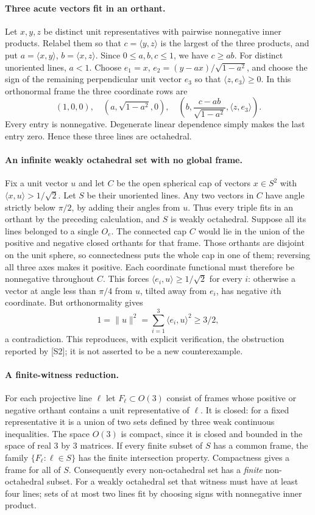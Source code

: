 \documentclass[11pt,a4paper]{article}
\begin{document}
\paragraph{Three acute vectors fit in an orthant.}
Let $x,y,z$ be distinct unit representatives with pairwise nonnegative inner
products. Relabel them so that $c=\langle y,z\rangle$ is the largest of the
three products, and put $a=\langle x,y\rangle$, $b=\langle x,z\rangle$.
Since $0\le a,b,c\le1$, we have $c\ge ab$. For distinct unoriented lines,
$a<1$. Choose $e_1=x$, $e_2=(y-ax)/\sqrt{1-a^2}$, and choose the sign of the
remaining perpendicular unit vector $e_3$ so that $\langle z,e_3\rangle\ge0$.
In this orthonormal frame the three coordinate rows are
\[
 (1,0,0),\quad(a,\sqrt{1-a^2},0),\quad
 \left(b,\frac{c-ab}{\sqrt{1-a^2}},\langle z,e_3\rangle\right).
\]
Every entry is nonnegative. Degenerate linear dependence simply makes the
last entry zero. Hence these three lines are octahedral.

\paragraph{An infinite weakly octahedral set with no global frame.}
Fix a unit vector $u$ and let $C$ be the open spherical cap of vectors
$x\in S^2$ with $\langle x,u\rangle>1/\sqrt2$. Let $S$ be their unoriented
lines. Any two vectors in $C$ have angle strictly below $\pi/2$, by adding
their angles from $u$. Thus every triple fits in an orthant by the preceding
calculation, and $S$ is weakly octahedral.
Suppose all its lines belonged to a single $O_e$. The connected cap $C$
would lie in the union of the positive and negative closed orthants for
that frame. Those orthants are disjoint on the unit sphere, so connectedness
puts the whole cap in one of them; reversing all three axes makes it positive.
Each coordinate functional must therefore be nonnegative throughout $C$.
This forces $\langle e_i,u\rangle\ge1/\sqrt2$ for every $i$: otherwise a vector
at angle less than $\pi/4$ from $u$, tilted away from $e_i$, has negative
$i$th coordinate. But orthonormality gives
\[
 1=\|u\|^2=\sum_{i=1}^3\langle e_i,u\rangle^2\ge3/2,
\]
a contradiction. This reproduces, with explicit verification, the obstruction
reported by [S2]; it is not asserted to be a new counterexample.

\paragraph{A finite-witness reduction.}
For each projective line $\ell$ let $F_\ell\subset O(3)$ consist of frames
whose positive or negative orthant contains a unit representative of $\ell$.
It is closed: for a fixed representative it is a union of two sets defined
by three weak continuous inequalities. The space $O(3)$ is compact, since
it is closed and bounded in the space of real $3$ by $3$ matrices.
If every finite subset of $S$ has a common frame, the family
$\{F_\ell:\ell\in S\}$ has the finite intersection property. Compactness
gives a frame for all of $S$. Consequently every non-octahedral set has a
\emph{finite} non-octahedral subset. For a weakly octahedral set that witness
must have at least four lines; sets of at most two lines fit by choosing
signs with nonnegative inner product.
\end{document}
